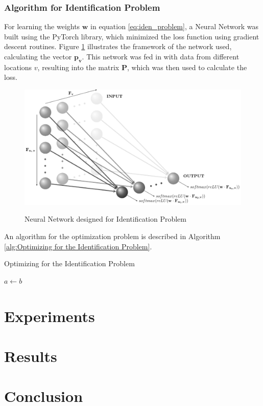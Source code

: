 \documentclass[12pt]{article}
\newcommand{\vect}[1]{\mathbf{#1}}  %
\newcommand{\matr}[1]{\mathbf{#1}}  %
\begin{document}
    
    \subsubsection{Algorithm for Identification Problem}
    For learning the weights $\matr{w}$ in equation \ref{eq:iden_problem}, a Neural Network was built using the PyTorch library, which minimized the loss function using gradient descent routines. Figure \ref{fig:Neural Network designed for Identification Problem} illustrates the framework of the network used, calculating the vector $\vect{p_v}$. This network was fed in with data from different locations $v$, resulting into the matrix $\matr{P}$, which was then used to calculate the loss.
    \begin{figure}[H]
        \caption{Neural Network designed for Identification Problem}
        \centering
        \includegraphics[width=\textwidth]{weights_net}
        \label{fig:Neural Network designed for Identification Problem}
    \end{figure}
    An algorithm for the optimization problem is described in Algorithm \ref{alg:Optimizing for the Identification Problem}.
    \begin{algorithm}
        \caption{Optimizing for the Identification Problem} \label{alg:Optimizing for the Identification Problem}
        \begin{algorithmic}[1]
            \State $a \gets b$
        \end{algorithmic}
    \end{algorithm}
    \section{Experiments}
    
    \section{Results}
    \section{Conclusion}
    
    \blindtext
    
    
\end{document}
